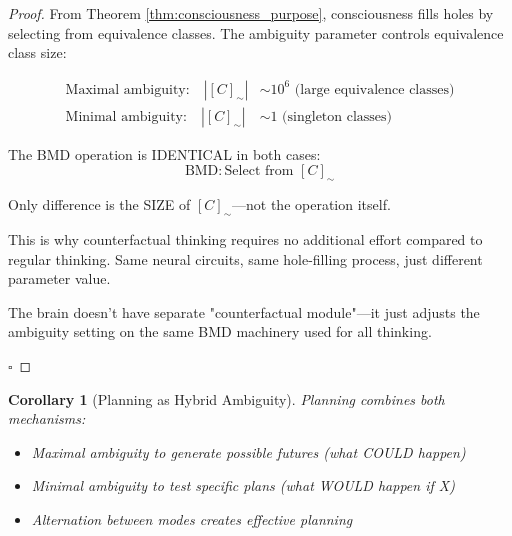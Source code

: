 \documentclass[11pt,a4paper]{article}
\newtheorem{corollary}[theorem]{Corollary}
\begin{document}
\begin{proof}
From Theorem \ref{thm:consciousness_purpose}, consciousness fills holes by selecting from equivalence classes. The ambiguity parameter controls equivalence class size:

\begin{align}
\text{Maximal ambiguity:} \quad |[C]_{\sim}| &\sim 10^6 \text{ (large equivalence classes)} \\
\text{Minimal ambiguity:} \quad |[C]_{\sim}| &\sim 1 \text{ (singleton classes)}
\end{align}

The BMD operation is IDENTICAL in both cases:
\begin{equation}
\text{BMD}: \text{Select from } [C]_{\sim}
\end{equation}

Only difference is the SIZE of $[C]_{\sim}$—not the operation itself.

This is why counterfactual thinking requires no additional effort compared to regular thinking. Same neural circuits, same hole-filling process, just different parameter value.

The brain doesn't have separate "counterfactual module"—it just adjusts the ambiguity setting on the same BMD machinery used for all thinking.

$\square$
\end{proof}

\begin{corollary}[Planning as Hybrid Ambiguity]
Planning combines both mechanisms:
\begin{itemize}
\item Maximal ambiguity to generate possible futures (what COULD happen)
\item Minimal ambiguity to test specific plans (what WOULD happen if X)
\item Alternation between modes creates effective planning
\end{itemize}
\end{corollary}
\end{document}
